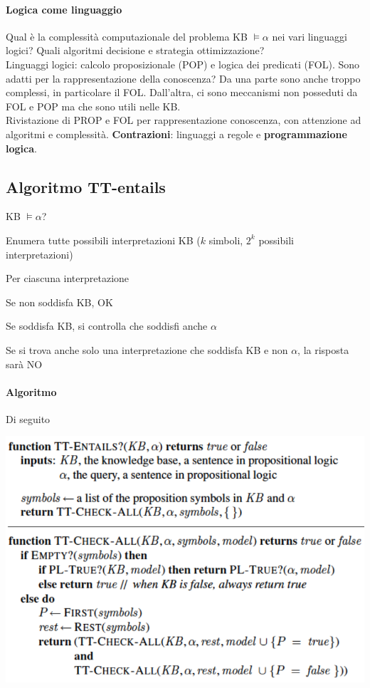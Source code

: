 \documentclass[10pt]{book}
\begin{document}
\paragraph{Logica come linguaggio}
Qual è la complessità computazionale del problema KB $\vDash \alpha$ nei vari linguaggi logici? Quali algoritmi decisione e strategia ottimizzazione?\\
Linguaggi logici: calcolo proposizionale (POP) e logica dei predicati (FOL). Sono adatti per la rappresentazione della conoscenza? Da una parte sono anche troppo complessi, in particolare il FOL. Dall'altra, ci sono meccanismi non posseduti da FOL e POP ma che sono utili nelle KB.\\
Rivistazione di PROP e FOL per rappresentazione conoscenza, con attenzione ad algoritmi e complessità. \textbf{Contrazioni}: linguaggi a regole e \textbf{programmazione logica}.

\subsection{Algoritmo TT-entails}
KB $\vDash \alpha$?
\begin{list}{}{}
	\item Enumera tutte possibili interpretazioni KB ($k$ simboli, $2^k$ possibili interpretazioni)
	\item Per ciascuna interpretazione
	\begin{list}{}{}
		\item Se non soddisfa KB, OK
		\item Se soddisfa KB, si controlla che soddisfi anche $\alpha$
		\item Se si trova anche solo una interpretazione che soddisfa KB e non $\alpha$, la risposta sarà NO
	\end{list}
\end{list}
\pagebreak
\paragraph{Algoritmo} Di seguito
\begin{center}
	\includegraphics[scale=0.7]{ttentails.png}
\end{center}
\end{document}
